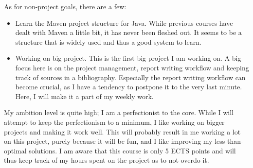 As for non-project goals, there are a few: 
\begin{itemize}

    \item Learn the Maven project structure for Java. While previous courses
    have dealt with Maven a little bit, it has never been fleshed out. It seems
    to be a structure that is widely used and thus a good system to learn. 

    \item Working on big project. This is the first big project I am working on.
    A big focus here is on the project management, report writing workflow and
    keeping track of sources in a bibliography. Especially the report writing
    workflow can become crucial, as I have a tendency to postpone it to the very
    last minute. Here, I will make it a part of my weekly work. 

\end{itemize}

My ambition level is quite high; I am a perfectionist to the core. While I will
attempt to keep the perfectionism to a minimum, I like working on bigger
projects and making it work well. This will probably result in me working a lot
on this project, purely because it will be fun, and I like improving my
less-than-optimal solutions. I am aware that this course is only 5 ECTS points
and will thus keep track of my hours spent on the project as to not overdo it. 

